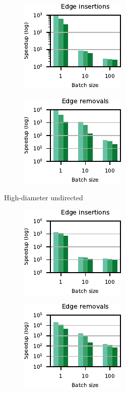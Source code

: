 \begin{figure}[tb]
%
\begin{subfigure}[t]{.5\textwidth}
\begin{subfigure}[t]{.5\textwidth}
\centering
\includegraphics{./sources/plots/dyn-topk/speedup-undirected-high-diameter-addition.pdf}
\end{subfigure}\hfill
\begin{subfigure}[t]{.5\textwidth}
\centering
\includegraphics{./sources/plots/dyn-topk/speedup-undirected-high-diameter-removal.pdf}
\end{subfigure}\hfill
\caption{High-diameter undirected}
\label{fig:dyn-topk-speedup-road-undir}
\end{subfigure}\hfill
%
%
\begin{subfigure}[t]{.5\textwidth}
\begin{subfigure}[t]{.5\textwidth}
\centering
\includegraphics{./sources/plots/dyn-topk/speedup-directed-high-diameter-addition.pdf}
\end{subfigure}\hfill
\begin{subfigure}[t]{.5\textwidth}
\centering
\includegraphics{./sources/plots/dyn-topk/speedup-directed-high-diameter-removal.pdf}

\end{subfigure}
\end{subfigure}
\end{figure}
